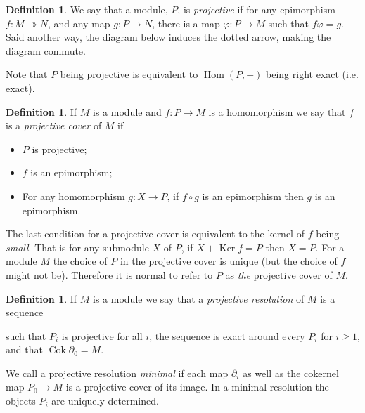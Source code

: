 \documentclass[11pt, a4paper, english]{article}
\theoremstyle{definition}
\newtheorem{defin}[theorem]{Definition}
\DeclareMathOperator{\Hom}{Hom}
\DeclareMathOperator{\Ker}{Ker}
\DeclareMathOperator{\Cok}{Cok}
\begin{document}
\begin{appendices}
\begin{defin}
\label{def:projective}
We say that a module, $P$, is \textit{projective} if for any epimorphism $f: M \twoheadrightarrow N$, and any map $g: P \to N$, there is a map $\varphi: P \to M$ such that $f \varphi = g$. Said another way, the diagram below induces the dotted arrow, making the diagram commute.
\begin{center}
\end{center}
Note that $P$ being projective is equivalent to $\Hom(P, -)$ being right exact (i.e. exact).
\end{defin}

\begin{defin}
\label{def:projective_cover}
If $M$ is a module and $f: P \to M$ is a homomorphism we say that $f$ is a \textit{projective cover} of $M$ if
\begin{itemize}
\item $P$ is projective;
\item $f$ is an epimorphism;
\item For any homomorphism $g: X \to P$, if $f \circ g$ is an epimorphism then $g$ is an epimorphism.
\end{itemize}
\end{defin}
The last condition for a projective cover is equivalent to the kernel of $f$ being \textit{small}. That is for any submodule $X$ of $P$, if $X + \Ker f = P$ then $X=P$. For a module $M$ the choice of $P$ in the projective cover is unique (but the choice of $f$ might not be). Therefore it is normal to refer to $P$ as \textit{the} projective cover of $M$.

\begin{defin}
\label{def:projective_resolution}
If $M$ is a module we say that a \textit{projective resolution} of $M$ is a sequence
\begin{center}
\end{center}
such that $P_i$ is projective for all $i$, the sequence is exact around every $P_i$ for $i \geq 1$, and that $\Cok \partial_0 = M$.

We call a projective resolution \textit{minimal} if each map $\partial_i$ as well as the cokernel map $P_0 \to M$ is a projective cover of its image. In a minimal resolution the objects $P_i$ are uniquely determined.
\end{defin}


\end{appendices}
\end{document}
